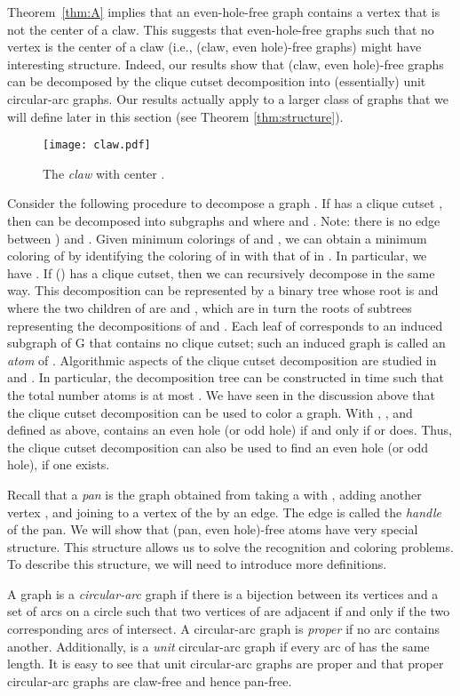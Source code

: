 \documentclass[11pt,a4paper]{article}
\begin{document}
Theorem~\ref{thm:A} implies that
an even-hole-free graph contains a vertex that is not the center
of a claw. This suggests that even-hole-free graphs such that no vertex
is the center of a claw (i.e., (claw, even hole)-free graphs)
might have interesting structure. Indeed, our results show that
(claw, even hole)-free graphs can be decomposed by the clique
cutset decomposition into (essentially) unit circular-arc graphs.
Our results actually apply to a larger class of graphs that we
will define later in this section (see Theorem \ref{thm:structure}).
\begin{figure}[h]
\centering
\texttt{[image: claw.pdf]}
\caption{The \emph{claw} with center .}
\label{fig:small}
\end{figure}

Consider  the following procedure to decompose a graph  . If
 has a clique cutset , then  can be decomposed into
subgraphs  and  where  and . Note: there is no edge between ) and .  Given minimum colorings of  and , we
can obtain a minimum coloring of  by identifying the coloring
of  in  with that of  in . In particular, we have
. If  ()
has a clique cutset, then we can recursively decompose  in
the same way.  This decomposition can be represented by a binary
tree  whose root is  and where the two children of  are
 and , which are in turn the roots of subtrees
representing the decompositions of  and . Each leaf of
 corresponds to an induced subgraph of G that contains no
clique cutset; such an induced graph is called an {\em atom} of
. Algorithmic aspects of the clique cutset decomposition are
studied in \cite{Tar1985} and \cite{Whi1984}. In particular, the
decomposition tree  can be constructed in  time such
that the total number atoms is at most  \cite{Tar1985}. We
have seen in the discussion above that the clique cutset decomposition
can be used to color a graph. With , , and  defined as
above,  contains an even hole (or odd hole) if and only if
 or  does. Thus, the clique cutset decomposition can
also be used to find an even hole (or odd hole), if one exists.

Recall that a {\it pan} is the graph obtained from taking a  with
, adding another vertex , and joining  to a vertex
 of the  by an edge. The edge  is called the {\em
handle} of the pan.  We will show that (pan, even hole)-free atoms
have very special structure. This structure allows us to solve the
recognition and coloring problems. To describe this structure, we will need to
introduce more definitions.

A graph  is a {\em circular-arc} graph if there is a bijection
between its vertices and a set  of arcs on a circle such that
two vertices of  are adjacent if and only if the two
corresponding arcs of  intersect. A circular-arc graph is {\it
proper}  if no arc contains another. Additionally,  is a {\em
unit} circular-arc graph if every arc of  has the same length.
It is easy to see that unit circular-arc graphs are proper and
that proper circular-arc graphs are claw-free and hence pan-free.
\end{document}
